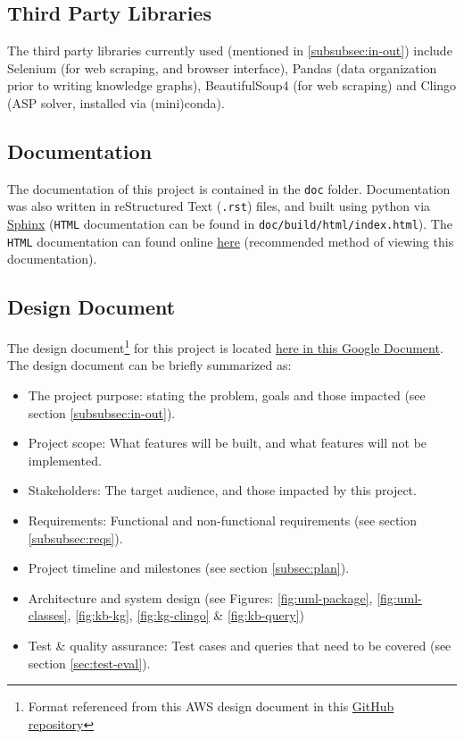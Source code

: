 \documentclass[12pt]{article}
\def \docLink{https://cse505.readthedocs.io/en/latest/?badge=latest}
\def \desDocLink{https://docs.google.com/document/d/1t48in8rdzC_VOijfAOP23C_YgAQxkow5eaE7AXEVUYM/edit?usp=sharing}
\begin{document}
    \subsection{Third Party Libraries}
    \label{subsec:thirdparty}

    The third party libraries currently used (mentioned in \ref{subsubsec:in-out}) include Selenium (for web scraping, and browser interface), Pandas (data organization prior to writing knowledge graphs), BeautifulSoup4 (for web scraping) and Clingo (ASP solver, installed via (mini)conda).

    \subsection{Documentation}
    \label{subsec:docs}

    The documentation of this project is contained in the {\tt{doc}} folder. Documentation was also written in reStructured Text ({\tt{.rst}}) files, and built using python via \href{https://www.sphinx-doc.org/en/master/}{Sphinx} ({\tt{HTML}} documentation can be found in {\tt{doc/build/html/index.html}}). The {\tt{HTML}} documentation can found online \href{\docLink}{here} (recommended method of viewing this documentation).

    \subsection{Design Document}
    \label{subsec:design-docs}

    The design document\footnote{Format referenced from this AWS design document in this \href{https://github.com/aws/aws-sam-cli/blob/develop/designs/intrinsics_design.md}{GitHub repository}} for this project is located \href{\desDocLink}{here in this Google Document}. The design document can be briefly summarized as:

    \begin{itemize}
        \item The project purpose: stating the problem, goals and those impacted (see section \ref{subsubsec:in-out}).
        \item Project scope: What features will be built, and what features will not be implemented.
        \item Stakeholders: The target audience, and those impacted by this project.
        \item Requirements: Functional and non-functional requirements (see section \ref{subsubsec:reqs}).
        \item Project timeline and milestones (see section \ref{subsec:plan}).
        \item Architecture and system design (see Figures: \ref{fig:uml-package}, \ref{fig:uml-classes}, \ref{fig:kb-kg}, \ref{fig:kg-clingo} \& \ref{fig:kb-query})
        \item Test \& quality assurance: Test cases and queries that need to be covered (see section \ref{sec:test-eval}).
    \end{itemize}
    
\end{document}
